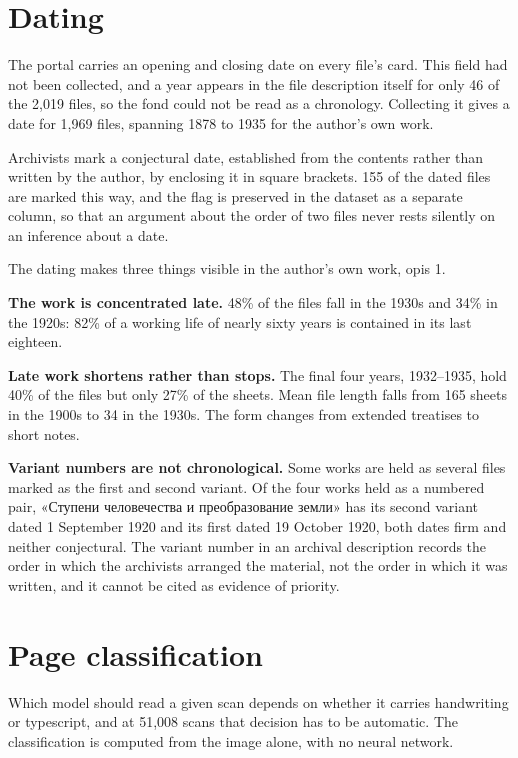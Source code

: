 \documentclass[11pt,a4paper]{article}
\begin{document}
\section{Dating}\label{dating}

The portal carries an opening and closing date on every file's card. This
field had not been collected, and a year appears in the file description
itself for only 46 of the 2,019 files, so the fond could not be read as a
chronology. Collecting it gives a date for 1,969 files, spanning 1878 to 1935
for the author's own work.

Archivists mark a conjectural date, established from the contents rather than
written by the author, by enclosing it in square brackets. 155 of the dated
files are marked this way, and the flag is preserved in the dataset as a
separate column, so that an argument about the order of two files never rests
silently on an inference about a date.

The dating makes three things visible in the author's own work, opis 1.

\textbf{The work is concentrated late.} 48\% of the files fall in the 1930s and 34\%
in the 1920s: 82\% of a working life of nearly sixty years is contained in its
last eighteen.

\textbf{Late work shortens rather than stops.} The final four years, 1932--1935,
hold 40\% of the files but only 27\% of the sheets. Mean file length falls from
165 sheets in the 1900s to 34 in the 1930s. The form changes from extended
treatises to short notes.

\textbf{Variant numbers are not chronological.} Some works are held as several
files marked as the first and second variant. Of the four works held as a
numbered pair, «Ступени человечества и преобразование земли» has its second
variant dated 1 September 1920 and its first dated 19 October 1920, both dates
firm and neither conjectural. The variant number in an archival description
records the order in which the archivists arranged the material, not the order
in which it was written, and it cannot be cited as evidence of priority.

\section{Page classification}\label{page-classification}

Which model should read a given scan depends on whether it carries handwriting
or typescript, and at 51,008 scans that decision has to be automatic. The
classification is computed from the image alone, with no neural network.
\end{document}

